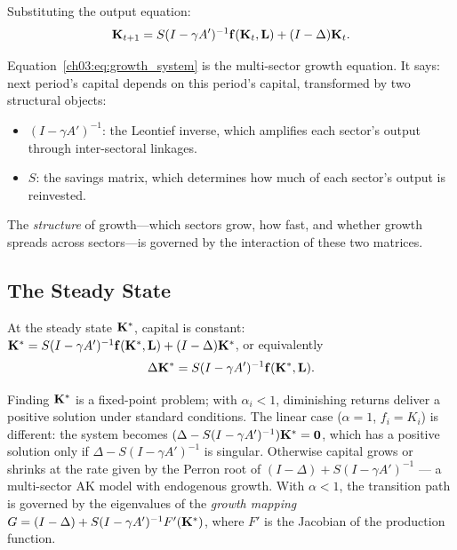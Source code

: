 \documentclass[../structural_economics_book.tex]{subfiles}
\begin{document}
Substituting the output equation:
\begin{equation}\label{ch03:eq:growth_system}
\mathbf{K}_{t+1} = S(I - \gamma A')^{-1}\mathbf{f}(\mathbf{K}_t, \mathbf{L}) + (I - \Delta)\mathbf{K}_t.
\end{equation}

\begin{keyinsight}
Equation~\eqref{ch03:eq:growth_system} is the multi-sector growth equation. It says: next period's capital depends on this period's capital, transformed by two structural objects:
\begin{itemize}
\item $(I - \gamma A')^{-1}$: the Leontief inverse, which amplifies each sector's output through inter-sectoral linkages.
\item $S$: the savings matrix, which determines how much of each sector's output is reinvested.
\end{itemize}

The \textit{structure} of growth---which sectors grow, how fast, and whether growth spreads across sectors---is governed by the interaction of these two matrices.
\end{keyinsight}


\subsection{The Steady State}

At the steady state $\mathbf{K}^*$, capital is constant: $\mathbf{K}^* = S(I - \gamma A')^{-1}\mathbf{f}(\mathbf{K}^*, \mathbf{L}) + (I - \Delta)\mathbf{K}^*$, or equivalently
\begin{equation}
\Delta \mathbf{K}^* = S(I - \gamma A')^{-1}\mathbf{f}(\mathbf{K}^*, \mathbf{L}).
\end{equation}

Finding $\mathbf{K}^*$ is a fixed-point problem; with $\alpha_i < 1$, diminishing returns deliver a positive solution under standard conditions. The linear case ($\alpha = 1$, $f_i = K_i$) is different: the system becomes $(\Delta - S(I - \gamma A')^{-1})\mathbf{K}^* = \mathbf{0}$, which has a positive solution only if $\Delta - S(I-\gamma A')^{-1}$ is singular. Otherwise capital grows or shrinks at the rate given by the Perron root of $(I - \Delta) + S(I - \gamma A')^{-1}$ --- a multi-sector AK model with endogenous growth. With $\alpha < 1$, the transition path is governed by the eigenvalues of the \textit{growth mapping} $G = (I - \Delta) + S(I - \gamma A')^{-1}F'(\mathbf{K}^*)$, where $F'$ is the Jacobian of the production function.
\end{document}
